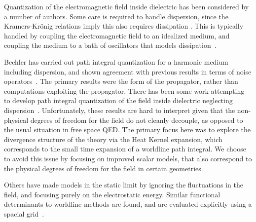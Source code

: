 Quantization of the electromagnetic field inside dielectric has been considered
 by a number of authors.  
Some care is required to handle dispersion, since the Kramers-Kr\"onig relations
 imply this also requires dissipation .  
This is typically handled by coupling the electromagnetic field to an idealized
 medium, and coupling the medium to a bath of oscillators that models
 dissipation~\cite{Huttner1992,Dung1998}.  

Bechler has carried out path integral quantization for a harmonic medium 
including dispersion, and shown agreement with previous results in terms 
of noise operators~\cite{Bechler1999}.  
The primary results were the form of the propagator, 
rather than computations exploiting the propagator.
  There has been some work attempting to develop path integral quantization of
 the field inside dielectric neglecting dispersion~\cite{Bordag1998}.
  Unfortunately, these results are hard to interpret given that the non-physical
 degrees of freedom for the field do not cleanly decouple, as opposed to the 
usual situation in free space QED.
  The primary focus here was to explore the divergence structure of the theory
 via the Heat Kernel expansion, which corresponds to the small time expansion
 of a worldline path integral.
  We choose to avoid this issue by focusing on improved scalar models, 
that also correspond to the physical degrees of freedom for the field in certain geometries.  

Others have made models in the static limit by ignoring the fluctuations in the field,
and focusing purely on the electrostatic energy.
 Similar functional determinants to worldline methods are found,
 and are evaluated explicitly using a spacial grid~\cite{Pasquali2008}.  


